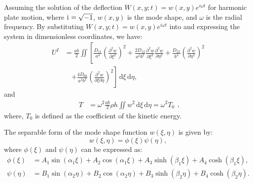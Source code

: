 \documentclass[preprint,12pt]{elsarticle}
\newcommand{\ii}{\mathrm{i}\mkern1mu}
\begin{document}
Assuming the solution of the deflection $ W(x, y; t) = w(x, y) e^{i \omega t} $ for harmonic plate motion, 
where $ \ii = \sqrt{-1} $, $ w(x, y) $ is the mode shape, and $ \omega $ is the radial frequency.  
By substituting $ W(x, y; t) = w(x, y) e^{i \omega t} $ into  and expressing the system in dimensionless coordinates, we have:
%
%
\begin{equation}\label{eq:poten_energy_mag}
	\begin{split}
		U^{I} &= \frac{ab}{2} \iint \left[ \frac{D_{11}}{a^4} \left( \frac{\partial^2 w}{\partial \xi^2} \right)^2 + \frac{2 D_{12}}{a^2 b^2} \frac{\partial^2 w}{\partial \xi^2} \frac{\partial^2 w}{\partial \eta^2} + \frac{D_{22}}{b^4} \left( \frac{\partial^2 w}{\partial \eta^2} \right)^2 \right. \\
		&\quad \left. + \frac{4 D_{66}}{a^2 b^2} \left( \frac{\partial^2 w}{\partial \xi \partial \eta} \right)^2 \right] \, \mathrm{d} \xi \, \mathrm{d} \eta,
	\end{split}
\end{equation}
%
and
%
%
\begin{equation}\label{eq:kine_energy_mag}
	\begin{split}
		T &= \omega^2 \frac{ab}{2} \rho h \iint w^2 \, \mathrm{d} \xi \, \mathrm{d} \eta=\omega^2T_0
	\end{split},
\end{equation}
%
where, $T_0$ is defined as the coefficient of the kinetic energy.

The separable form of the mode shape function $ w(\xi, \eta)$ is given by:
%
\begin{equation}\label{eq:displace_func}
	w(\xi, \eta) = \phi(\xi) \psi(\eta),
\end{equation}
%
where $ \phi(\xi) $ and $\psi(\eta) $ can be expressed as:
\begin{subequations}\label{eq:phi_psi_solution}
	\begin{align}
		\phi(\xi) &= A_1 \sin{(\alpha_1 \xi)} + A_2 \cos{(\alpha_1 \xi)} + A_3 \sinh{(\beta_1 \xi)} + A_4 \cosh{(\beta_1 \xi)},\label{eq:phi_solution1}\\
		\psi(\eta) &= B_1 \sin{(\alpha_2 \eta)} + B_2 \cos{(\alpha_2 \eta)} + B_3 \sinh{(\beta_2 \eta)} + B_4 \cosh{(\beta_2 \eta)}. \label{eq:phi_solution2}
	\end{align}
\end{subequations}
\end{document}
